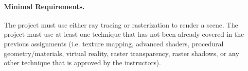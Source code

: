 \documentclass[11pt]{article}
\begin{document}
\paragraph{Minimal Requirements.} The project must use either ray tracing or rasterization to render a scene. The project must use at least one technique that has not been already covered in the previous assignments (i.e. texture mapping, advanced shaders, procedural geometry/materials, virtual reality, raster transparency, raster shadows, or any other technique that is approved by the instructors).

%
%
\end{document}
